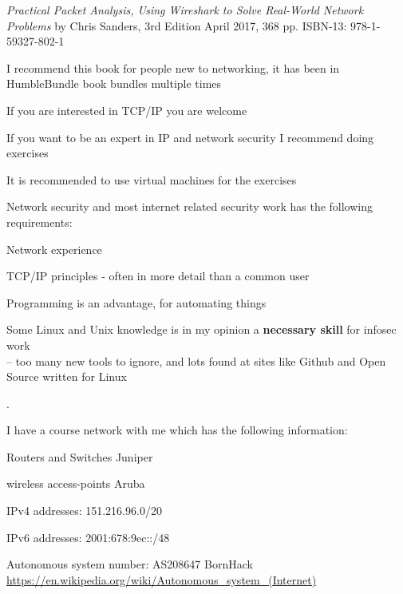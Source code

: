 \documentclass[Screen16to9,17pt]{foils}
\begin{document}



\emph{Practical Packet Analysis,
Using Wireshark to Solve Real-World Network Problems}
by Chris Sanders, 3rd Edition
April 2017, 368 pp.
ISBN-13:
978-1-59327-802-1

I recommend this book for people new to networking, it has been in HumbleBundle book bundles multiple times



If you are interested in TCP/IP you are welcome

If you want to be an expert in IP and network security I recommend doing exercises

\begin{list1}
\item It is recommended to use virtual machines for the exercises
\item Network security and most internet related security work has the following requirements:
\begin{list2}
\item Network experience
\item TCP/IP principles - often in more detail than a common user
\item Programming is an advantage, for automating things
\item Some Linux and Unix knowledge is in my opinion a {\bf necessary skill} for infosec work\\
-- too many new tools to ignore, and lots found at sites like Github and Open Source written for Linux
\end{list2}
\end{list1}



.

\begin{list1}
\item I have a course network with me which has the following information:
\begin{list2}
\item Routers and Switches Juniper
\item wireless access-points Aruba
\item IPv4 addresses: 151.216.96.0/20
\item IPv6 addresses: 2001:678:9ec::/48
\item Autonomous system number: AS208647 BornHack\\
\url{https://en.wikipedia.org/wiki/Autonomous_system_(Internet)}

\end{list2}
\end{list1}
\end{document}
